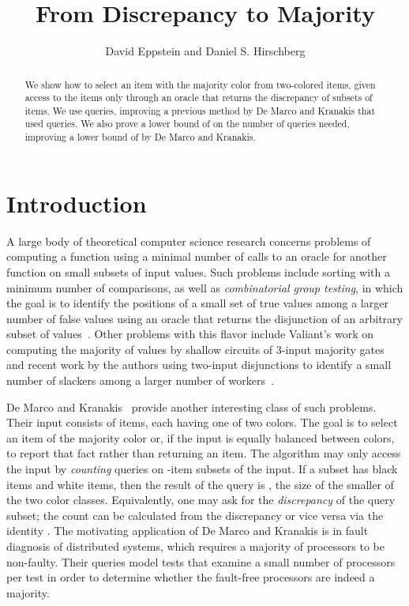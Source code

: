 \documentclass[11pt]{llncs}
\title{From Discrepancy to Majority}
\author{David Eppstein and Daniel S. Hirschberg}
\institute{Department of Computer Science, University of California, Irvine\thanks{David Eppstein was supported in part by NSF grant  CCF-1228639.}}
\begin{document}
\maketitle

\begin{abstract}
We show how to select an item with the majority color from  two-colored items, given access to the items only through an oracle that returns the discrepancy of subsets of  items. We use  queries, improving a previous method by De Marco and Kranakis that used  queries. We also prove a lower bound of  on the number of queries needed, improving a lower bound of  by De Marco and Kranakis.
\end{abstract}

\section{Introduction}

A large body of theoretical computer science research concerns problems of computing a function using a minimal number of calls to an oracle for another function on small subsets of input values. Such problems include sorting with a minimum number of comparisons, as well as \emph{combinatorial group testing}, in which the goal is to identify the positions of a small set of true values among a larger number of false values using an oracle that returns the disjunction of an arbitrary subset of values~\cite{DuHwa-CGT-00,EppGooHir-SJC-07}. Other problems with this flavor include Valiant's work on computing the majority of  values by shallow circuits of 3-input majority gates~\cite{Val-JA-84} and recent work by the authors  using two-input disjunctions to identify a small number of slackers among a larger number of workers~\cite{EppGooHir-WADS-13}.

De Marco and Kranakis~\cite{DeMKra-DMAA-15} provide another interesting  class of such problems. Their input consists of  items, each having one of two colors. The goal is to select an item of the majority color or, if the input is equally balanced between colors, to report that fact rather than returning an item. The algorithm may only access the input by \emph{counting} queries on -item subsets of the input. If a subset has  black items and  white items, then the result of the query is , the size of the smaller of the two color classes. Equivalently, one may ask for the \emph{discrepancy}  of the query subset; the count can be calculated from the discrepancy or vice versa via the identity . The motivating application of De Marco and Kranakis is in fault diagnosis of distributed systems, which requires a majority of processors to be non-faulty. Their queries model tests that examine a small number of processors per test in order to determine whether the fault-free processors are indeed a majority.
\end{document}
